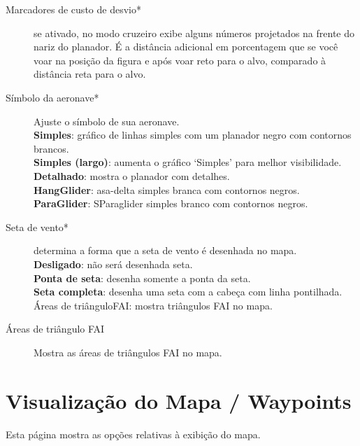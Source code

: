 \begin{description}
\item[Marcadores de custo de desvio*]  se ativado, no modo cruzeiro exibe alguns números projetados na frente do nariz do planador.  É a distância adicional em porcentagem que se você voar na posição da figura e após voar reto para o alvo, comparado à distância reta para o alvo.
\item[Símbolo da aeronave*]  Ajuste o símbolo de sua aeronave. \\
  {\bf Simples}: gráfico de linhas simples com um planador negro com contornos brancos. \\
  {\bf Simples (largo)}: aumenta o gráfico ‘Simples’ para melhor visibilidade. \\
  {\bf Detalhado}: mostra o planador com detalhes. \\
  {\bf HangGlider}: asa-delta simples branca com contornos negros. \\
  {\bf ParaGlider}: SParaglider simples branco com contornos negros.
\item[Seta de vento*]  determina a forma que a seta de vento é desenhada no mapa. \\
  {\bf Desligado}: não será desenhada seta. \\
  {\bf Ponta de seta}: desenha somente a ponta da seta. \\
  {\bf Seta completa}: desenha uma seta com a cabeça com linha pontilhada.  Áreas de triânguloFAI: mostra triângulos FAI no mapa.
\item[Áreas de triângulo FAI] Mostra as áreas de triângulos FAI no mapa.
  
\end{description}


\section{Visualização do Mapa / Waypoints}\label{sec:waypoint-display}

Esta página mostra as opções relativas à exibição do mapa.

